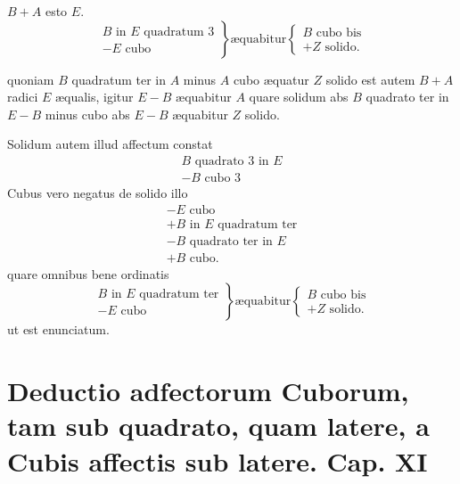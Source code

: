 \documentclass[11pt,a4paper]{article}
\begin{document}

$B + A$ esto $E$.
\[ \left.\begin{array}{l} B \text{ in } E \text{ quadratum } 3 \\ - E \text{ cubo} \end{array}\right\} \text{æquabitur} \left\{\begin{array}{l} B \text{ cubo bis} \\ + Z \text{ solido.} \end{array}\right. \]

quoniam $B$ quadratum ter in $A$ minus $A$ cubo æquatur $Z$ solido est autem $B + A$ radici $E$ æqualis, igitur $E - B$ æquabitur $A$ quare solidum abs $B$ quadrato ter in $E - B$ minus cubo abs $E - B$ æquabitur $Z$ solido.

Solidum autem illud affectum constat
\[ \begin{array}{l} B \text{ quadrato } 3 \text{ in } E \\ - B \text{ cubo } 3 \end{array} \]
Cubus vero negatus de solido illo
\[ \begin{array}{l} - E \text{ cubo} \\ + B \text{ in } E \text{ quadratum ter} \\ - B \text{ quadrato ter in } E \\ + B \text{ cubo.} \end{array} \]
quare omnibus bene ordinatis
\[ \left.\begin{array}{l} B \text{ in } E \text{ quadratum ter} \\ - E \text{ cubo} \end{array}\right\} \text{æquabitur} \left\{\begin{array}{l} B \text{ cubo bis} \\ + Z \text{ solido.} \end{array}\right. \]
ut est enunciatum.

\section*{Deductio adfectorum Cuborum, tam sub quadrato, quam latere, a Cubis affectis sub latere. Cap. XI}
\end{document}
